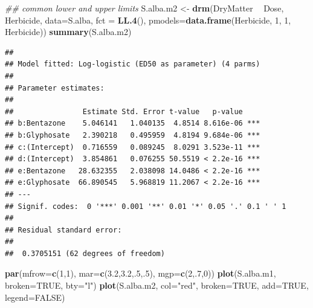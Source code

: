 \documentclass[letterpaper,]{book}
\newenvironment{Shaded}{\begin{snugshade}}{\end{snugshade}}
\newcommand{\CommentTok}[1]{\textcolor[rgb]{0.56,0.35,0.01}{\textit{#1}}}
\newcommand{\DataTypeTok}[1]{\textcolor[rgb]{0.13,0.29,0.53}{#1}}
\newcommand{\DecValTok}[1]{\textcolor[rgb]{0.00,0.00,0.81}{#1}}
\newcommand{\FloatTok}[1]{\textcolor[rgb]{0.00,0.00,0.81}{#1}}
\newcommand{\KeywordTok}[1]{\textcolor[rgb]{0.13,0.29,0.53}{\textbf{#1}}}
\newcommand{\NormalTok}[1]{#1}
\newcommand{\OperatorTok}[1]{\textcolor[rgb]{0.81,0.36,0.00}{\textbf{#1}}}
\newcommand{\OtherTok}[1]{\textcolor[rgb]{0.56,0.35,0.01}{#1}}
\newcommand{\StringTok}[1]{\textcolor[rgb]{0.31,0.60,0.02}{#1}}
\begin{document}
\begin{Shaded}
\begin{Highlighting}[]
\CommentTok{##  common lower and upper limits}
\NormalTok{S.alba.m2 <-}\StringTok{ }\KeywordTok{drm}\NormalTok{(DryMatter }\OperatorTok{~}\StringTok{ }\NormalTok{Dose, Herbicide, }\DataTypeTok{data=}\NormalTok{S.alba, }\DataTypeTok{fct =} \KeywordTok{LL.4}\NormalTok{(),}
                 \DataTypeTok{pmodels=}\KeywordTok{data.frame}\NormalTok{(Herbicide, }\DecValTok{1}\NormalTok{, }\DecValTok{1}\NormalTok{, Herbicide)) }
\KeywordTok{summary}\NormalTok{(S.alba.m2)}
\end{Highlighting}
\end{Shaded}

\begin{verbatim}
## 
## Model fitted: Log-logistic (ED50 as parameter) (4 parms)
## 
## Parameter estimates:
## 
##                Estimate Std. Error t-value   p-value    
## b:Bentazone    5.046141   1.040135  4.8514 8.616e-06 ***
## b:Glyphosate   2.390218   0.495959  4.8194 9.684e-06 ***
## c:(Intercept)  0.716559   0.089245  8.0291 3.523e-11 ***
## d:(Intercept)  3.854861   0.076255 50.5519 < 2.2e-16 ***
## e:Bentazone   28.632355   2.038098 14.0486 < 2.2e-16 ***
## e:Glyphosate  66.890545   5.968819 11.2067 < 2.2e-16 ***
## ---
## Signif. codes:  0 '***' 0.001 '**' 0.01 '*' 0.05 '.' 0.1 ' ' 1
## 
## Residual standard error:
## 
##  0.3705151 (62 degrees of freedom)
\end{verbatim}

\begin{Shaded}
\begin{Highlighting}[]
\KeywordTok{par}\NormalTok{(}\DataTypeTok{mfrow=}\KeywordTok{c}\NormalTok{(}\DecValTok{1}\NormalTok{,}\DecValTok{1}\NormalTok{), }\DataTypeTok{mar=}\KeywordTok{c}\NormalTok{(}\FloatTok{3.2}\NormalTok{,}\FloatTok{3.2}\NormalTok{,.}\DecValTok{5}\NormalTok{,.}\DecValTok{5}\NormalTok{), }\DataTypeTok{mgp=}\KeywordTok{c}\NormalTok{(}\DecValTok{2}\NormalTok{,.}\DecValTok{7}\NormalTok{,}\DecValTok{0}\NormalTok{))}
\KeywordTok{plot}\NormalTok{(S.alba.m1, }\DataTypeTok{broken=}\OtherTok{TRUE}\NormalTok{, }\DataTypeTok{bty=}\StringTok{"l"}\NormalTok{)}
\KeywordTok{plot}\NormalTok{(S.alba.m2, }\DataTypeTok{col=}\StringTok{"red"}\NormalTok{, }\DataTypeTok{broken=}\OtherTok{TRUE}\NormalTok{, }\DataTypeTok{add=}\OtherTok{TRUE}\NormalTok{, }\DataTypeTok{legend=}\OtherTok{FALSE}\NormalTok{)}
\end{Highlighting}
\end{Shaded}
\end{document}
